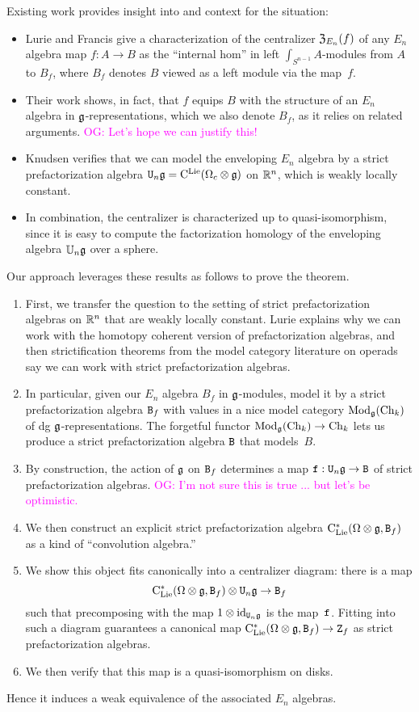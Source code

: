 \documentclass[11pt]{amsart}
\numberwithin{equation}{section}
\def\owen{\textcolor{magenta}{OG: }\textcolor{magenta}}
\begin{document}
Existing work provides insight into and context for the situation:
\begin{itemize}
\item Lurie and Francis give a characterization of the centralizer ${\frak Z}_{E_n}(f)$ of any $E_n$ algebra map $f: A \to B$ as the ``internal hom'' in left $\int_{S^{n-1}}A$-modules from $A$ to $B_f$, where $B_f$ denotes $B$ viewed as a left module via the map~$f$.
\item Their work shows, in fact, that $f$ equips $B$ with the structure of an $E_n$ algebra in $\mathfrak g$-representations,
which we also denote $B_f$, as it relies on related arguments. \owen{Let's hope we can justify this!}
\item Knudsen verifies that we can model the enveloping $E_n$ algebra by a strict prefactorization algebra ${\tt U}_n \mathfrak g = {\rm C}^{\rm Lie}(\Omega_c \otimes \mathfrak g)$ on $\mathbb R^n$, which is weakly locally constant.
\item In combination, the centralizer is characterized up to quasi-isomorphism, 
since it is easy to compute the factorization homology of the enveloping algebra $\mathbb U_n \mathfrak g$ over a sphere.
\end{itemize}
Our approach leverages these results as follows to prove the theorem.
\begin{enumerate}
\item First, we transfer the question to the setting of strict prefactorization algebras on $\mathbb R^n$ that are weakly locally constant. Lurie \cite{LurieHA} explains why we can work with the homotopy coherent version of prefactorization algebras, and then strictification theorems from the model category literature on operads say we can work with strict prefactorization algebras.
\item  In particular, given our $E_n$ algebra $B_f$ in $\mathfrak g$-modules,  model it by a strict prefactorization algebra ${\tt B}_f$ with values in a nice model category ${\rm Mod}_\mathfrak g({\rm Ch}_k)$ of dg $\mathfrak g$-representations.
The forgetful functor ${\rm Mod}_\mathfrak g({\rm Ch}_k) \to {\rm Ch}_k$ lets us produce a strict prefactorization algebra ${\tt B}$ that models~$B$.
\item By construction, the action of $\mathfrak g$ on ${\tt B}_f$ determines a map ${\tt f}:  {\tt U}_n \mathfrak g \to {\tt B}$ of strict prefactorization algebras.
\owen{I'm not sure this is true ... but let's be optimistic.}
\item We then construct an explicit strict prefactorization algebra ${\rm C}_{\rm Lie}^*(\Omega \otimes \mathfrak g, {\tt B}_f)$ as a kind of ``convolution algebra.'' 
\item We show this object fits canonically into a centralizer diagram: there is a map
\[
{\rm C}_{\rm Lie}^*(\Omega \otimes \mathfrak g, {\tt B}_f) \otimes {\tt U}_n \mathfrak g \to {\tt B}_f
\]
such that precomposing with the map $1 \otimes {\rm id}_{{\tt U}_n \mathfrak g}$ is the map~${\tt f}$.
Fitting into such a diagram guarantees a canonical map ${\rm C}_{\rm Lie}^*(\Omega \otimes \mathfrak g, {\tt B}_f) \to {\tt Z}_f$ as strict prefactorization algebras. 
\item We then verify that this map is a quasi-isomorphism on disks. 
\end{enumerate}
Hence it induces a weak equivalence of the associated $E_n$ algebras. 
\end{document}
